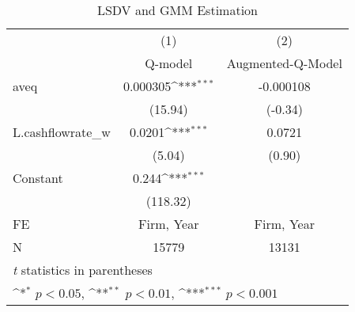 \begin{table}[htbp]\centering
\def\sym#1{\ifmmode^{#1}\else\(^{#1}\)\fi}
\caption{LSDV and GMM Estimation}
\begin{tabular}{l*{2}{c}}
\toprule
                    &\multicolumn{1}{c}{(1)}&\multicolumn{1}{c}{(2)}\\
                    &\multicolumn{1}{c}{Q-model}&\multicolumn{1}{c}{Augmented-Q-Model}\\
\midrule
aveq                &    0.000305\sym{***}&   -0.000108         \\
                    &     (15.94)         &     (-0.34)         \\
\addlinespace
L.cashflowrate\_w    &      0.0201\sym{***}&      0.0721         \\
                    &      (5.04)         &      (0.90)         \\
\addlinespace
Constant            &       0.244\sym{***}&                     \\
                    &    (118.32)         &                     \\
\midrule
FE                  &  Firm, Year         &  Firm, Year         \\
N                   &       15779         &       13131         \\
\bottomrule
\multicolumn{3}{l}{\footnotesize \textit{t} statistics in parentheses}\\
\multicolumn{3}{l}{\footnotesize \sym{*} \(p<0.05\), \sym{**} \(p<0.01\), \sym{***} \(p<0.001\)}\\
\end{tabular}
\end{table}
